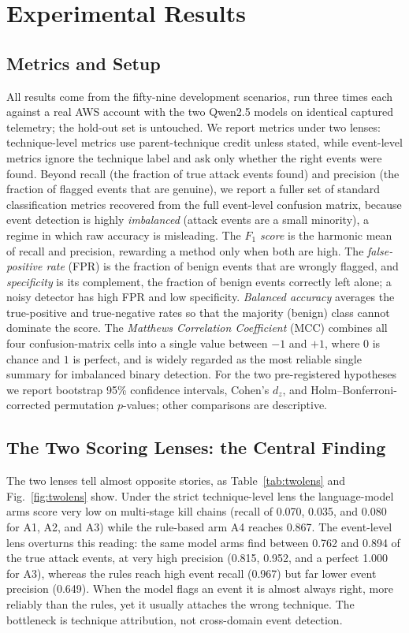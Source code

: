 \documentclass[journal]{IEEEtran}
\begin{document}
\section{Experimental Results}\label{sec:results}

\subsection{Metrics and Setup}
All results come from the fifty-nine development scenarios, run three times each against a real AWS
account with the two Qwen2.5 models on identical captured telemetry; the hold-out set is untouched.
We report metrics under two lenses: technique-level metrics use parent-technique credit unless stated,
while event-level metrics ignore the technique label and ask only whether the right events were found.
Beyond recall (the fraction of true attack events found) and precision (the fraction of flagged events
that are genuine), we report a fuller set of standard classification metrics recovered from the full
event-level confusion matrix, because event detection is highly \emph{imbalanced} (attack events are a
small minority), a regime in which raw accuracy is misleading. The \emph{$F_1$ score} is the harmonic
mean of recall and precision, rewarding a method only when both are high. The \emph{false-positive rate}
(FPR) is the fraction of benign events that are wrongly flagged, and \emph{specificity} is its
complement, the fraction of benign events correctly left alone; a noisy detector has high FPR and low
specificity. \emph{Balanced accuracy} averages the true-positive and true-negative rates so that the
majority (benign) class cannot dominate the score. The \emph{Matthews Correlation Coefficient} (MCC)
combines all four confusion-matrix cells into a single value between $-1$ and $+1$, where $0$ is chance
and $1$ is perfect, and is widely regarded as the most reliable single summary for imbalanced binary
detection. For the two pre-registered hypotheses we report bootstrap 95\% confidence intervals, Cohen's
$d_z$, and Holm--Bonferroni-corrected permutation $p$-values; other comparisons are descriptive.

\subsection{The Two Scoring Lenses: the Central Finding}
The two lenses tell almost opposite stories, as Table~\ref{tab:twolens} and Fig.~\ref{fig:twolens}
show. Under the strict technique-level lens the language-model arms score very low on multi-stage
kill chains (recall of 0.070, 0.035, and 0.080 for A1, A2, and A3) while the rule-based arm A4
reaches 0.867. The event-level lens overturns this reading: the same model arms find between 0.762 and
0.894 of the true attack events, at very high precision (0.815, 0.952, and a perfect 1.000 for A3),
whereas the rules reach high event recall (0.967) but far lower event precision (0.649). When the
model flags an event it is almost always right, more reliably than the rules, yet it usually attaches
the wrong technique. The bottleneck is technique attribution, not cross-domain event detection.
\end{document}
